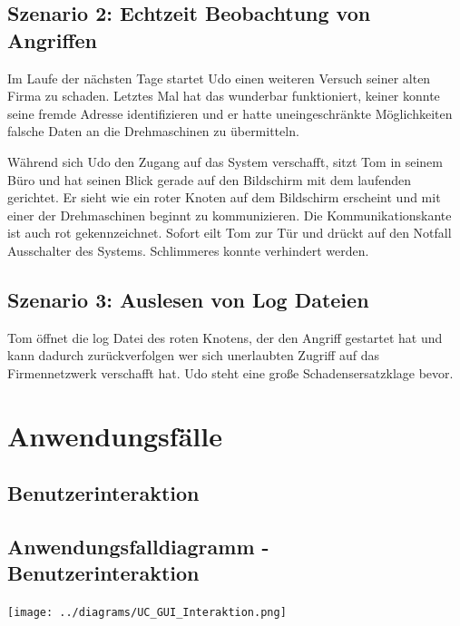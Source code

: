 \subsection{Szenario 2: Echtzeit Beobachtung von Angriffen}

Im Laufe der nächsten Tage startet Udo einen weiteren Versuch seiner alten Firma zu schaden. Letztes Mal hat das wunderbar funktioniert, keiner konnte seine fremde Adresse identifizieren und er hatte uneingeschränkte Möglichkeiten falsche Daten an die Drehmaschinen zu übermitteln.

Während sich Udo den Zugang auf das System verschafft, sitzt Tom in seinem Büro und hat seinen Blick gerade auf den Bildschirm mit dem laufenden \programname gerichtet. Er sieht wie ein roter Knoten auf dem Bildschirm erscheint und mit einer der Drehmaschinen beginnt zu kommunizieren. Die Kommunikationskante ist auch rot gekennzeichnet. Sofort eilt Tom zur Tür und drückt auf den Notfall Ausschalter des Systems. Schlimmeres konnte verhindert werden.

\subsection{Szenario 3: Auslesen von Log Dateien}

Tom öffnet die log Datei des roten Knotens, der den Angriff gestartet hat und kann dadurch zurückverfolgen wer sich unerlaubten Zugriff auf das Firmennetzwerk verschafft hat. Udo steht eine große Schadensersatzklage bevor.


\section{Anwendungsfälle}

\subsection{Benutzerinteraktion}


\subsection*{Anwendungsfalldiagramm - Benutzerinteraktion}

\texttt{[image: ../diagrams/UC\_GUI\_Interaktion.png]}


